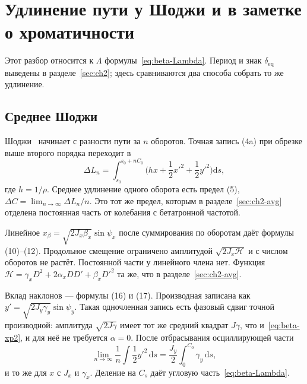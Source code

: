 \section{Удлинение пути у Шоджи и в заметке о хроматичности}
\label{app:ch2path}

Этот разбор относится к $\Lambda$ формулы~\eqref{eq:beta-Lambda}. Период и знак $\delta_{\mathrm{eq}}$ выведены в разделе~\ref{sec:ch2}; здесь сравниваются два способа собрать то же удлинение.

\subsection{Среднее Шоджи}
\label{sec:ch2-shoji}

Шоджи~\cite{Shoji2005} начинает с разности пути за $n$ оборотов. Точная запись (4a) при обрезке выше второго порядка переходит в
\begin{equation}
\label{eq:beta-shoji-4b}
\Delta L_n
=\int_{s_0}^{s_0+n C_0}
\Biggl(hx+\frac{1}{2}x'^2+\frac{1}{2}y'^2\Biggr)\mathrm{d}s,
\end{equation}
где $h=1/\rho$. Среднее удлинение одного оборота есть предел (5), $\Delta C=\lim_{n\to\infty}\Delta L_n/n$. Это тот же предел, которым в разделе~\ref{sec:ch2-avg} отделена постоянная часть от колебания с бетатронной частотой.

Линейное $x_\beta=\sqrt{2J_x\beta_x}\sin\psi_x$ после суммирования по оборотам даёт формулы (10)--(12). Продольное смещение ограничено амплитудой $\sqrt{2J_x\mathcal{H}}$ и с числом оборотов не растёт. Постоянной части у линейного члена нет. Функция $\mathcal{H}=\gamma_x D^2+2\alpha_x DD'+\beta_x D'^2$ та же, что в разделе~\ref{sec:ch2-avg}.

Вклад наклонов --- формулы (16) и (17). Производная записана как $y'=\sqrt{2J_y\gamma_y}\sin\psi_y$. Такая одночленная запись есть фазовый сдвиг точной производной: амплитуда $\sqrt{2J\gamma}$ имеет тот же средний квадрат $J\gamma$, что и~\eqref{eq:beta-xp2}, и для неё не требуется $\alpha=0$. После отбрасывания осциллирующей части
\begin{equation}
\label{eq:beta-shoji-slope}
\lim_{n\to\infty}\frac{1}{n}\int\frac{1}{2}y'^2\,\mathrm{d}s
=\frac{J_y}{2}\int_0^{C_0}\gamma_y\,\mathrm{d}s,
\end{equation}
и то же для $x$ с $J_x$ и $\gamma_x$. Деление на $C_s$ даёт угловую часть~\eqref{eq:beta-Lambda}.


